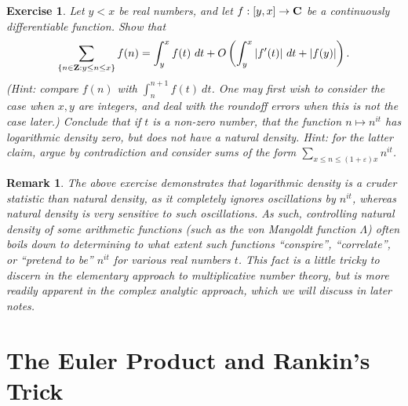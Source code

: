 \documentclass[10pt,reqno]{amsart}
\newtheorem{exercise}[theorem]{Exercise}
\newtheorem{remark}[theorem]{Remark}
\begin{document}
\begin{exercise}
    Let $y < x$ be real numbers, and let $f: [y,x] \rightarrow {\bf C}$ be a continuously differentiable function. Show that
    \[ \sum_{\{n \in {\bf Z}: y \leq n \leq x\}} f(n) = \int_y^x f(t)\ dt + O \left( \int_y^x |f'(t)|\ dt + |f(y)| \right). \]
    (Hint: compare $f(n)$ with $\int_n^{n+1} f(t)\ dt$. One may first wish to consider the case when $x,y$ are integers, and deal with the roundoff errors when this is not the case later.) Conclude that if $t$ is a non-zero number, that the function $n \mapsto n^{it}$ has logarithmic density zero, but does not have a natural density. Hint: for the latter claim, argue by contradiction and consider sums of the form $\sum_{x \leq n \leq (1+\varepsilon) x} n^{it}$.
\end{exercise}

\begin{remark}
    The above exercise demonstrates that logarithmic density is a cruder statistic than natural density, as it completely ignores oscillations by $n^{it}$, whereas natural density is very sensitive to such oscillations. As such, controlling natural density of some arithmetic functions (such as the von Mangoldt function $\Lambda$) often boils down to determining to what extent such functions “conspire”, “correlate”, or “pretend to be” $n^{it}$ for various real numbers $t$. This fact is a little tricky to discern in the elementary approach to multiplicative number theory, but is more readily apparent in the complex analytic approach, which we will discuss in later notes.
\end{remark}

\section{The Euler Product and Rankin's Trick}
\end{document}
